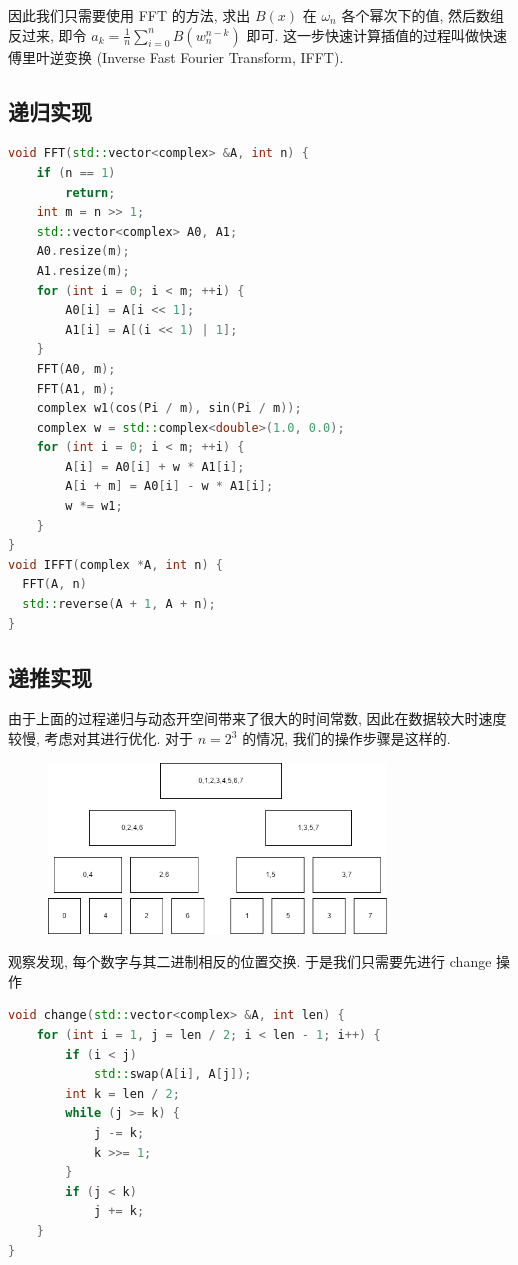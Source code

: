 \documentclass[UTF8, a4paper, 11pt]{ctexart}
\theoremstyle{definition}
\begin{document}
因此我们只需要使用 FFT 的方法, 求出 $B(x)$ 在 $\omega_n$ 各个幂次下的值, 然后数组反过来, 即令 $a_k=\frac{1}{n} \sum_{i = 0}^n B(w_n^{n - k})$ 即可. 这一步快速计算插值的过程叫做快速傅里叶逆变换 (Inverse Fast Fourier Transform, IFFT). 

\subsection{递归实现}

\begin{lstlisting}[language=C++]
void FFT(std::vector<complex> &A, int n) {
    if (n == 1)
        return;
    int m = n >> 1;
    std::vector<complex> A0, A1;
    A0.resize(m);
    A1.resize(m);
    for (int i = 0; i < m; ++i) {
        A0[i] = A[i << 1];
        A1[i] = A[(i << 1) | 1];
    }
    FFT(A0, m);
    FFT(A1, m);
    complex w1(cos(Pi / m), sin(Pi / m));
    complex w = std::complex<double>(1.0, 0.0);
    for (int i = 0; i < m; ++i) {
        A[i] = A0[i] + w * A1[i];
        A[i + m] = A0[i] - w * A1[i];
        w *= w1;
    }
}
void IFFT(complex *A, int n) {
  FFT(A, n)
  std::reverse(A + 1, A + n);
}
\end{lstlisting}

\subsection{递推实现}

由于上面的过程递归与动态开空间带来了很大的时间常数, 因此在数据较大时速度较慢, 考虑对其进行优化. 对于 $n=2^3$ 的情况, 我们的操作步骤是这样的.

\begin{figure}[H] 
    \centering
    \includegraphics[width=0.8\textwidth]{1.png}
\end{figure}

观察发现, 每个数字与其二进制相反的位置交换. 于是我们只需要先进行 change 操作

\begin{lstlisting}[language=C++]
void change(std::vector<complex> &A, int len) {
    for (int i = 1, j = len / 2; i < len - 1; i++) {
        if (i < j)
            std::swap(A[i], A[j]);
        int k = len / 2;
        while (j >= k) {
            j -= k;
            k >>= 1;
        }
        if (j < k)
            j += k;
    }
}
\end{lstlisting}
\end{document}
